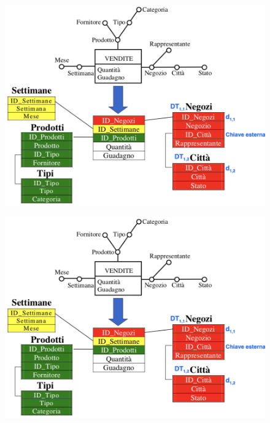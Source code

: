 \documentclass[a4paper, notitlepage, 9pt]{extreport}
\begin{document}
\begin{multicols}{2}
\begin{figure}[H]
	\centering
	\includegraphics[scale=0.38]{Snowflake}
\end{figure}
\columnbreak
\begin{figure}[H]
	\centering
	\includegraphics[scale=0.38]{Snowflake}
\end{figure}
\end{multicols}
\end{document}
